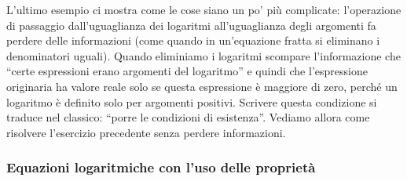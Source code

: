 L'ultimo esempio ci mostra come le cose siano un po' più complicate: 
l'operazione di passaggio dall'uguaglianza dei logaritmi all'uguaglianza 
degli argomenti fa perdere delle informazioni (come quando in un'equazione 
fratta si eliminano i denominatori uguali). 
Quando eliminiamo i logaritmi scompare l'informazione che ``certe 
espressioni erano argomenti del logaritmo'' e quindi che l'espressione 
originaria ha valore reale solo se questa espressione è maggiore di zero, 
perché un logaritmo è definito solo per argomenti positivi. 
Scrivere questa condizione si traduce nel classico: ``porre le condizioni 
di esistenza''.
Vediamo allora come risolvere l'esercizio precedente senza perdere 
informazioni.



\subsubsection{Equazioni logaritmiche con l'uso delle proprietà}
\label{subsubsec:esplog_eq_log_proprieta}

